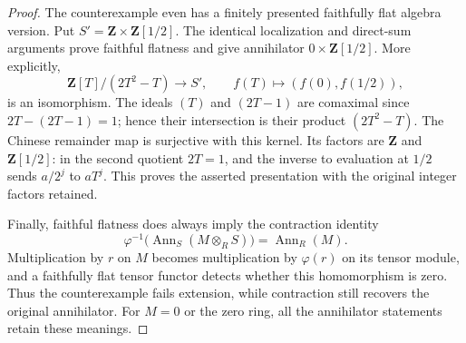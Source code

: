 \begin{proof}
The counterexample even has a finitely presented faithfully
flat algebra version. Put $S'=\mathbf Z\times\mathbf Z[1/2]$.
The identical localization and direct-sum arguments prove
faithful flatness and give annihilator $0\times\mathbf Z[1/2]$.
More explicitly,
$$
\mathbf Z[T]/(2T^2-T)\longrightarrow S',
\qquad f(T)\longmapsto(f(0),f(1/2)),
$$
is an isomorphism. The ideals $(T)$ and $(2T-1)$ are
comaximal since $2T-(2T-1)=1$; hence their intersection
is their product $(2T^2-T)$. The Chinese remainder map
is surjective with this kernel. Its factors are $\mathbf Z$
and $\mathbf Z[1/2]$: in the second quotient $2T=1$, and
the inverse to evaluation at $1/2$ sends $a/2^j$ to $aT^j$.
This proves the asserted presentation with the original
integer factors retained.

Finally, faithful flatness does always imply the contraction
identity
$$
\varphi^{-1}\bigl(\operatorname{Ann}_S(M\otimes_RS)\bigr)
=\operatorname{Ann}_R(M).
$$
Multiplication by $r$ on $M$ becomes multiplication by
$\varphi(r)$ on its tensor module, and a faithfully flat
tensor functor detects whether this homomorphism is zero.
Thus the counterexample fails extension, while contraction
still recovers the original annihilator. For $M=0$ or the
zero ring, all the annihilator statements retain these meanings.
\end{proof}